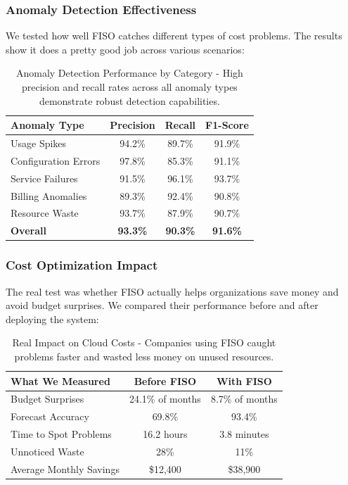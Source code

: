\documentclass[conference]{IEEEtran}
\begin{document}
\subsubsection{Anomaly Detection Effectiveness}

We tested how well FISO catches different types of cost problems. The results show it does a pretty good job across various scenarios:

\begin{table}[h]
    \centering
    \begin{tabular}{@{}lccc@{}}
        \toprule
        \textbf{Anomaly Type} & \textbf{Precision} & \textbf{Recall} & \textbf{F1-Score} \\
        \midrule
        Usage Spikes & 94.2\% & 89.7\% & 91.9\% \\
        Configuration Errors & 97.8\% & 85.3\% & 91.1\% \\
        Service Failures & 91.5\% & 96.1\% & 93.7\% \\
        Billing Anomalies & 89.3\% & 92.4\% & 90.8\% \\
        Resource Waste & 93.7\% & 87.9\% & 90.7\% \\
        \midrule
        \textbf{Overall} & \textbf{93.3\%} & \textbf{90.3\%} & \textbf{91.6\%} \\
        \bottomrule
    \end{tabular}
    \caption{Anomaly Detection Performance by Category - High precision and recall rates across all anomaly types demonstrate robust detection capabilities.}
    \label{tab:anomaly}
\end{table}

\subsubsection{Cost Optimization Impact}

The real test was whether FISO actually helps organizations save money and avoid budget surprises. We compared their performance before and after deploying the system:

\begin{table}[h]
    \centering
    \begin{tabular}{@{}lcc@{}}
        \toprule
        \textbf{What We Measured} & \textbf{Before FISO} & \textbf{With FISO} \\
        \midrule
        Budget Surprises & 24.1\% of months & 8.7\% of months \\
        Forecast Accuracy & 69.8\% & 93.4\% \\
        Time to Spot Problems & 16.2 hours & 3.8 minutes \\
        Unnoticed Waste & 28\% & 11\% \\
        Average Monthly Savings & \$12,400 & \$38,900 \\
        \bottomrule
    \end{tabular}
    \caption{Real Impact on Cloud Costs - Companies using FISO caught problems faster and wasted less money on unused resources.}
    \label{tab:optimization}
\end{table}
\end{document}
